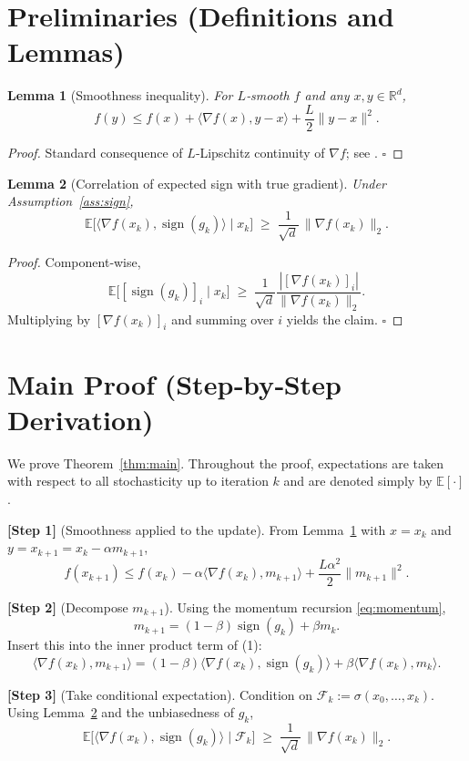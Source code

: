 \documentclass{article}
\newtheorem{lemma}{Lemma}
\newcommand{\sign}{\operatorname{sign}}
\newcommand{\E}{\mathbb{E}}
\newcommand{\R}{\mathbb{R}}
\begin{document}
\section*{Preliminaries (Definitions and Lemmas)}
\begin{lemma}[Smoothness inequality]\label{lem:smooth}
For $L$‑smooth $f$ and any $x,y\in\R^{d}$,
\[
f(y)\le f(x)+\langle \nabla f(x),y-x\rangle+\frac{L}{2}\|y-x\|^{2}.
\]
\end{lemma}
\begin{proof}
Standard consequence of $L$‑Lipschitz continuity of $\nabla f$; see \cite{nesterov2004introductory}. \hfill $\square$
\end{proof}

\begin{lemma}[Correlation of expected sign with true gradient]\label{lem:signcorr}
Under Assumption~\ref{ass:sign},
\[
\E\big[\langle \nabla f(x_{k}),\sign(g_{k})\rangle\mid x_{k}\big]
\;\ge\;
\frac{1}{\sqrt d}\,\|\nabla f(x_{k})\|_{2}.
\]
\end{lemma}
\begin{proof}
Component‑wise,
\[
\E\big[[\sign(g_{k})]_{i}\mid x_{k}\big]\;
\ge\;
\frac{1}{\sqrt d}\frac{|[\nabla f(x_{k})]_{i}|}{\|\nabla f(x_{k})\|_{2}} .
\]
Multiplying by $[\nabla f(x_{k})]_{i}$ and summing over $i$ yields the claim. \hfill $\square$
\end{proof}

\section*{Main Proof (Step‑by‑Step Derivation)}
We prove Theorem~\ref{thm:main}. Throughout the proof, expectations are taken with respect to all stochasticity up to iteration $k$ and are denoted simply by $\E[\cdot]$.

\bigskip
\noindent\textbf{[Step 1]} (Smoothness applied to the update).  
From Lemma~\ref{lem:smooth} with $x=x_{k}$ and $y=x_{k+1}=x_{k}-\alpha m_{k+1}$,
\[
f(x_{k+1})\le f(x_{k})-\alpha\langle \nabla f(x_{k}),m_{k+1}\rangle
+\frac{L\alpha^{2}}{2}\|m_{k+1}\|^{2}. \tag{1}
\]

\noindent\textbf{[Step 2]} (Decompose $m_{k+1}$).  
Using the momentum recursion \eqref{eq:momentum},
\[
m_{k+1}= (1-\beta)\sign(g_{k})+\beta m_{k}.
\]
Insert this into the inner product term of (1):
\[
\langle \nabla f(x_{k}),m_{k+1}\rangle
=(1-\beta)\langle \nabla f(x_{k}),\sign(g_{k})\rangle
+\beta\langle \nabla f(x_{k}),m_{k}\rangle. \tag{2}
\]

\noindent\textbf{[Step 3]} (Take conditional expectation).  
Condition on $\mathcal{F}_{k}:=\sigma(x_{0},\dots,x_{k})$.  
Using Lemma~\ref{lem:signcorr} and the unbiasedness of $g_{k}$,
\[
\E\!\big[\langle \nabla f(x_{k}),\sign(g_{k})\rangle\mid\mathcal{F}_{k}\big]
\;\ge\;
\frac{1}{\sqrt d}\,\|\nabla f(x_{k})\|_{2}. \tag{3}
\]
\end{document}
